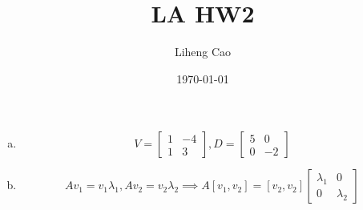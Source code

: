 \documentclass[12pt]{article}
\title{LA HW2} %
\author{Liheng Cao} %
\date{\today} %
\begin{document}
\maketitle

\section{} %
\begin{enumerate}[(a)]
	\item 
	\[ V = 
		\begin{bmatrix}
			1 & -4\\
			1 & 3
		\end{bmatrix}
		, D = 
		\begin{bmatrix}
			5 & 0\\
			0 & -2
		\end{bmatrix}
	\]
		 
	\item \[ Av_1 = v_1\lambda_1, Av_2 = v_2\lambda_2 \implies A [v_1, v_2] = [v_2, v_2]
		\begin{bmatrix}
			\lambda_1 & 0\\
			0 & \lambda_2
		\end{bmatrix}  
	\]
	

\end{enumerate}
\end{document}
